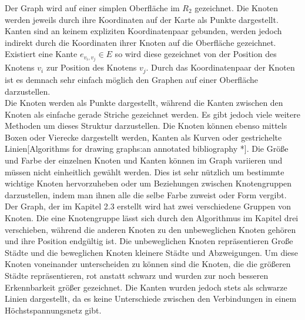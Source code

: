 Der Graph wird auf einer simplen Oberfläche im $R_{2}$ gezeichnet. Die Knoten werden jeweils durch ihre Koordinaten auf der Karte als Punkte dargestellt. Kanten sind an keinem expliziten Koordinatenpaar gebunden, werden jedoch indirekt durch die Koordinaten ihrer Knoten auf die Oberfläche gezeichnet. Existiert eine Kante $e_{v_{i},v_{j}} \in E$ so wird diese gezeichnet von der Position des Knotens $v_{i}$ zur Position des Knotens $v_{j}$. Durch das Koordinatenpaar der Knoten ist es demnach sehr einfach möglich den Graphen auf einer Oberfläche darzustellen. \\

Die Knoten werden als Punkte dargestellt, während die Kanten zwischen den Knoten als einfache gerade Striche gezeichnet werden. Es gibt jedoch viele weitere Methoden um dieses Struktur darzustellen. Die Knoten können ebenso mittels Boxen oder Vierecke dargestellt werden, Kanten als Kurven oder gestrichelte Linien[Algorithms for drawing graphs:an annotated bibliography *]. Die Größe und Farbe der einzelnen Knoten und Kanten können im Graph variieren und müssen nicht einheitlich gewählt werden. Dies ist sehr nützlich um bestimmte wichtige Knoten hervorzuheben oder um Beziehungen zwischen Knotengruppen darzustellen, indem man ihnen alle die selbe Farbe zuweist oder Form vergibt. Der Graph, der im Kapitel 2.3 erstellt wird hat zwei verschiedene Gruppen von Knoten. Die eine Knotengruppe lässt sich durch den Algorithmus im Kapitel drei verschieben, während die anderen Knoten zu den unbeweglichen Knoten gehören und ihre Position endgültig ist. Die unbeweglichen Knoten repräsentieren Große Städte und die beweglichen Knoten kleinere Städte und Abzweigungen. Um diese Knoten voneinander unterscheiden zu können sind die Knoten, die die größeren Städte repräsentieren, rot anstatt schwarz
 und wurden zur noch besseren Erkennbarkeit größer gezeichnet. Die Kanten wurden jedoch stets als schwarze Linien dargestellt, da es keine Unterschiede zwischen den Verbindungen in einem Höchstspannungsnetz gibt. 

